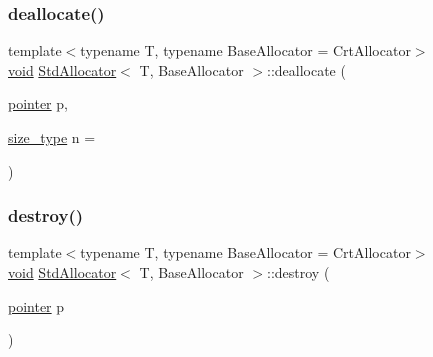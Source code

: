 \subsubsection{\texorpdfstring{deallocate()}{deallocate()}\hspace{0.1cm}{\footnotesize\ttfamily [2/2]}}
{\footnotesize\ttfamily template$<$typename T, typename Base\+Allocator = Crt\+Allocator$>$ \\
\hyperlink{imgui__impl__opengl3__loader_8h_ac668e7cffd9e2e9cfee428b9b2f34fa7}{void} \hyperlink{classStdAllocator}{Std\+Allocator}$<$ T, Base\+Allocator $>$\+::deallocate (\begin{DoxyParamCaption}\item[{\hyperlink{classStdAllocator_a0c970fb2525af736640f0ac3a29d45c5}{pointer}}]{p,  }\item[{\hyperlink{classStdAllocator_af0b177dc293fe5b985ba9e27de23b2c1}{size\+\_\+type}}]{n = {} }\end{DoxyParamCaption})\hspace{0.3cm}{\ttfamily [inline]}}

\mbox{\label{classStdAllocator_a2aebac89efaaac9707d380b95c902567}} 
\subsubsection{\texorpdfstring{destroy()}{destroy()}}
{\footnotesize\ttfamily template$<$typename T, typename Base\+Allocator = Crt\+Allocator$>$ \\
\hyperlink{imgui__impl__opengl3__loader_8h_ac668e7cffd9e2e9cfee428b9b2f34fa7}{void} \hyperlink{classStdAllocator}{Std\+Allocator}$<$ T, Base\+Allocator $>$\+::destroy (\begin{DoxyParamCaption}\item[{\hyperlink{classStdAllocator_a0c970fb2525af736640f0ac3a29d45c5}{pointer}}]{p }\end{DoxyParamCaption})\hspace{0.3cm}{\ttfamily [inline]}}

\mbox{\label{classStdAllocator_ae3b6918eee229eeb89e9535d65296d6d}} 
